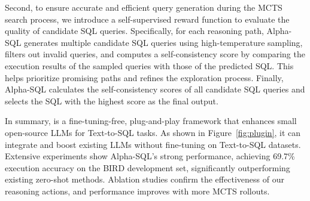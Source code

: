 
Second, to ensure accurate and efficient query generation during the MCTS search process, we introduce a self-supervised reward function to evaluate the quality of candidate SQL queries. Specifically, for each reasoning path, Alpha-SQL generates multiple candidate SQL queries using high-temperature sampling, filters out invalid queries, and computes a self-consistency score by comparing the execution results of the sampled queries with those of the predicted SQL. This helps prioritize promising paths and refines the exploration process.
Finally, Alpha-SQL calculates the self-consistency scores of all candidate SQL queries and selects the SQL with the highest score as the final output.

In summary, \sys is a fine-tuning-free, plug-and-play \nlsql framework that enhances small open-source LLMs for Text-to-SQL tasks.  As shown in Figure~\ref{fig:plugin}, it can integrate and boost existing LLMs without fine-tuning on Text-to-SQL datasets. Extensive experiments show Alpha-SQL's strong performance, achieving 69.7\% execution accuracy on the BIRD development set, significantly outperforming existing zero-shot methods. Ablation studies confirm the effectiveness of our reasoning actions, and performance improves with more MCTS rollouts.

